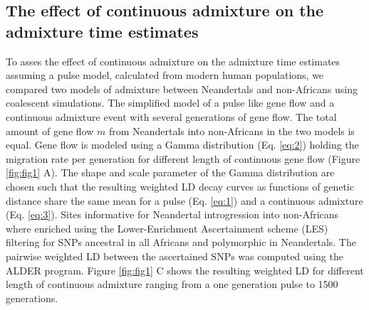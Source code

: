 \documentclass[]{article}
\begin{document}
\subsection{The effect of continuous admixture on the admixture time estimates}\label{the effect of continuous admixture on the admixture time estimates}

To asses the effect of continuous admixture on the admixture
time estimates assuming a pulse model, calculated from modern human populations, we compared two
models of admixture between Neandertals and non-Africans using
coalescent simulations. The simplified model of a pulse like gene flow
and a continuous admixture event with several generations of gene flow.
The total amount of gene flow \(m\) from Neandertals into non-Africans
in the two models is equal. Gene flow is modeled using a Gamma
distribution (Eq. \ref{eq:2}) holding the migration rate per generation
for different length of continuous gene flow (Figure \ref{fig:fig1} A).
The shape and scale parameter of the Gamma distribution are chosen such
that the resulting weighted LD decay curves as functions of genetic
distance share the same mean for a pulse (Eq. \ref{eq:1}) and a
continuous admixture (Eq. \ref{eq:3}). Sites informative for Neandertal
introgression into non-Africans where enriched using the
Lower-Enrichment Ascertainment scheme (LES) filtering for SNPs ancestral in
all Africans and polymorphic in Neandertals. The pairwise weighted LD
between the ascertained SNPs was computed using the ALDER program.
Figure \ref{fig:fig1} C shows the resulting weighted LD for different
length of continuous admixture ranging from a one generation pulse to
1500 generations.
\end{document}
